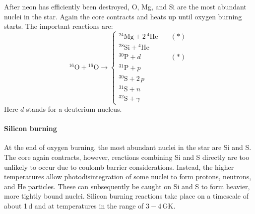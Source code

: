 After neon has efficiently been destroyed, O, Mg, and Si are the most abundant nuclei in the star. Again the core contracts and heats up until oxygen burning starts. The important reactions are:
\begin{equation}
{^{16}}\mathrm{O} + {^{16}}\mathrm{O} \longrightarrow 
    \begin{cases}
        {^{24}}\mathrm{Mg} + 2\,{^4}\mathrm{He} \quad & (*)\\
        {^{28}}\mathrm{Si} + {^4}\mathrm{He}\\
        {^{30}}\mathrm{P} + d \quad & (*)\\
        {^{31}}\mathrm{P} + p\\
        {^{30}}\mathrm{S} + 2\,p\\
        {^{31}}\mathrm{S} + n\\
        {^{32}}\mathrm{S} + \gamma
    \end{cases}
\end{equation}
Here $d$ stands for a deuterium nucleus. 

\paragraph{Silicon burning}
At the end of oxygen burning, the most abundant nuclei in the star are Si and S. The core again contracts, however, reactions combining Si and S directly are too unlikely to occur due to coulomb barrier considerations. Instead, the higher temperatures allow photodisintegration of some nuclei to form protons, neutrons, and He particles. These can subsequently be caught on Si and S to form heavier, more tightly bound nuclei. Silicon burning reactions take place on a timescale of about 1\,d and at temperatures in the range of $3-4$\,GK.

